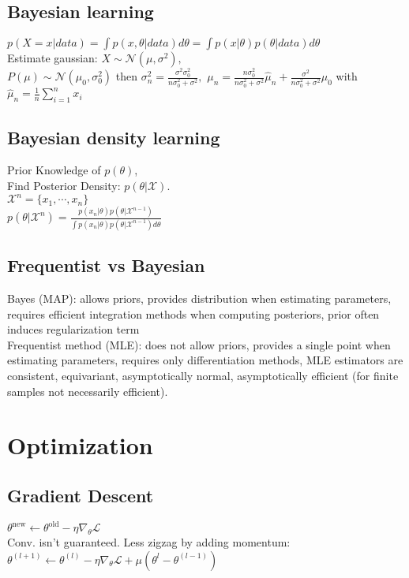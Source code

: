 \subsection*{Bayesian learning}
$p(X=x|data) = \int p(x, \theta | data) d\theta = \int p(x|\theta)p(\theta|data)d\theta$ \\
Estimate gaussian: $X \sim \mathcal{N}(\mu, \sigma^2),$ \\
$P(\mu) \sim \mathcal{N}(\mu_0, \sigma_0^2)$ then $\sigma_n^2 = \frac{\sigma^2 \sigma_0^2}{n\sigma_0^2 + \sigma^2},$ $ \mu_n = \frac{n\sigma_0^2}{n\sigma_0^2 + \sigma^2} \hat \mu_n + \frac{\sigma^2}{n\sigma_0^2 + \sigma^2}\mu_0$ with \\
$\hat \mu_n = \frac{1}{n}\sum_{i=1}^n x_i$
\subsection*{Bayesian density learning}
Prior Knowledge of $p(\theta)$,\\
Find Posterior Density: $p(\theta|\mathcal{X})$.\\
$\mathcal{X}^n=\{x_1, \cdots, x_n\}$\\
$p(\theta|\mathcal{X}^n)=\frac{p(x_n|\theta)p(\theta|\mathcal{X}^{n-1})}{\int p(x_n|\theta)p(\theta|\mathcal{X}^{n-1}) d\theta}$


\subsection*{Frequentist vs Bayesian}
Bayes (MAP): allows priors, provides distribution when estimating parameters, requires efficient integration methods when computing posteriors, prior often induces regularization term \\
Frequentist method (MLE): does not allow priors, provides a single point when estimating parameters, requires only differentiation methods, MLE estimators are consistent, equivariant, asymptotically normal, asymptotically efficient (for finite samples not necessarily efficient). 

\section*{Optimization}
\subsection*{Gradient Descent}
$\theta^{\mathrm{new}}\leftarrow\theta^{\mathrm{old}}-\eta\nabla_{\theta}\mathcal{L}$\\
Conv. isn't guaranteed.
Less zigzag by adding momentum: $\theta^{(l+1)}\leftarrow\theta^{(l)}-\eta\nabla_{\theta}\mathcal{L}+\mu(\theta^{l}-\theta^{(l-1)})$


